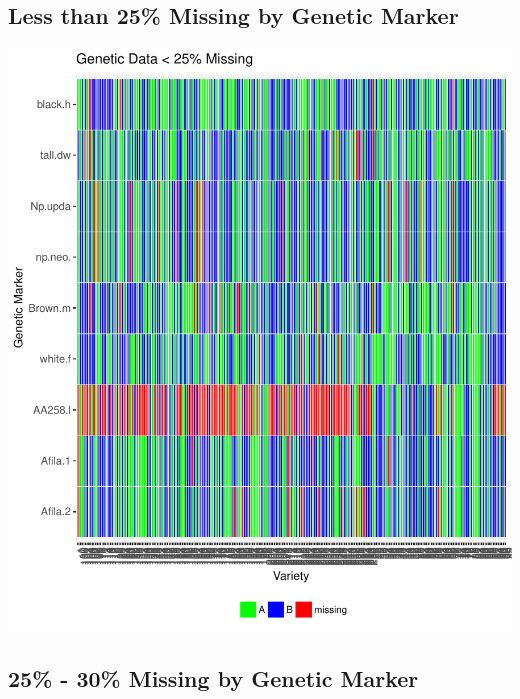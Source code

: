 \documentclass[11pt]{article}\usepackage[]{graphicx}\usepackage[]{color}
\makeatletter
\def\maxwidth{ %
  \ifdim\Gin@nat@width>\linewidth
    \linewidth
  \else
    \Gin@nat@width
  \fi
}
\newenvironment{knitrout}{}{} %
\makeatother
\begin{document}
\pagebreak

\subsection{Less than 25\% Missing by Genetic Marker}




\begin{knitrout}\footnotesize
{}\color{fgcolor}

{\centering \includegraphics[width=\maxwidth]{figure/missing_plot25-1} 

}



\end{knitrout}
\pagebreak
\subsection{25\% - 30\% Missing by Genetic Marker}
\end{document}
